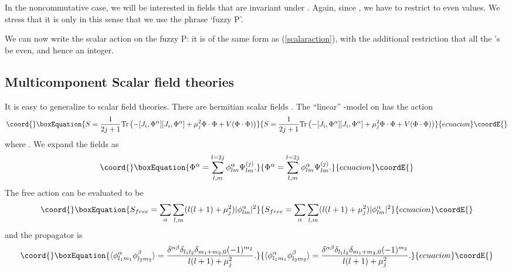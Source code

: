 \documentclass[a4paper,12pt]{article}
\numberwithin{equation}{section}
\begin{document}
In the noncommutative case, we will be interested in fields that are
invariant under \coordHE{}. Again, since
\coordHE{}, we have
to restrict \coordHE{} to even values. We stress that it is only in this
sense that we use the phrase `fuzzy \coordHE{}P\coordHE{}'.

We can now write the scalar action on the fuzzy \coordHE{}P\coordHE{}: it
is of the same form as (\ref{scalaraction}), with the additional
restriction that all the \coordHE{}'s be even, and hence \coordHE{} an integer.

\subsection{Multicomponent Scalar field theories}
It is easy to generalize to \coordHE{} scalar field theories. There are
\coordHE{} hermitian scalar fields \coordHE{}. The
``linear'' \myHighlight{$\sigma$}\coordHE{}-model on \coordHE{} has the action
\begin{equation}\coord{}\boxEquation{ 
S = \frac{1}{2j+1} \text{Tr}\left(- [J_i, \Phi^\alpha][J_i, \Phi^\alpha] +
\mu_j^2 \Phi \cdot \Phi + V(\Phi \cdot \Phi)\right)
}{ 
S = \frac{1}{2j+1} \text{Tr}\left(- [J_i, \Phi^\alpha][J_i, \Phi^\alpha] +
\mu_j^2 \Phi \cdot \Phi + V(\Phi \cdot \Phi)\right)
}{ecuacion}\coordE{}\end{equation} 
where \coordHE{}. We expand the fields \myHighlight{$\Phi^\alpha$}\coordHE{} as
\begin{equation}\coord{}\boxEquation{ 
\Phi^\alpha = \sum_{l,m}^{l=2j} \phi^\alpha_{lm} \Psi^{(j)}_{lm}.
}{ 
\Phi^\alpha = \sum_{l,m}^{l=2j} \phi^\alpha_{lm} \Psi^{(j)}_{lm}.
}{ecuacion}\coordE{}\end{equation} 
The free action can be evaluated to be
\begin{equation}\coord{}\boxEquation{ 
S_{free} = \sum_{\alpha} \sum_{l,m} (l(l+1)+\mu_j^2)|\phi^\alpha_{lm}|^2  
}{ 
S_{free} = \sum_{\alpha} \sum_{l,m} (l(l+1)+\mu_j^2)|\phi^\alpha_{lm}|^2  
}{ecuacion}\coordE{}\end{equation} 
and the propagator is
\begin{equation}\coord{}\boxEquation{ 
\langle \phi^\alpha_{l_1 m_1} \phi^\beta_{l_2 m_2}\rangle =
\frac{\delta^{\alpha \beta} \delta_{l_1 l_2} \delta_{m_1 + m_2, 0}
(-1)^{m_2}}{l(l+1) + \mu_j^2}.  
}{ 
\langle \phi^\alpha_{l_1 m_1} \phi^\beta_{l_2 m_2}\rangle =
\frac{\delta^{\alpha \beta} \delta_{l_1 l_2} \delta_{m_1 + m_2, 0}
(-1)^{m_2}}{l(l+1) + \mu_j^2}.  
}{ecuacion}\coordE{}\end{equation} 
\end{document}

